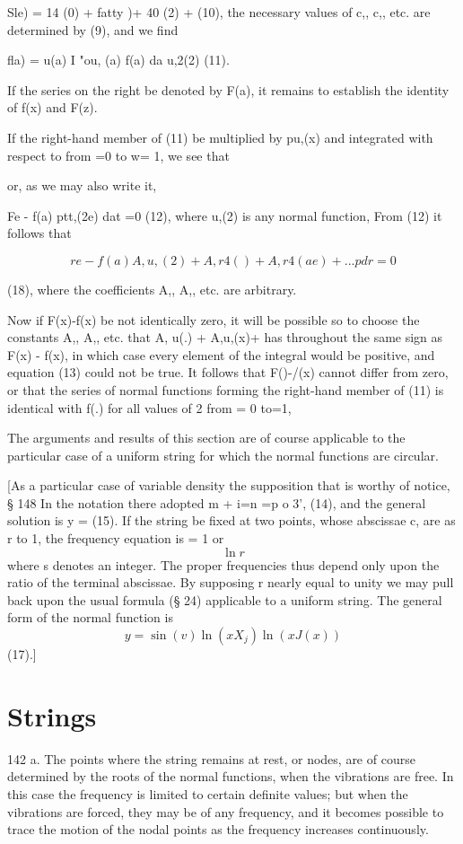 Sle) = 14 (0) + fatty )+ 40 (2) + (10), the necessary values of c,, c,,
etc. are determined by (9), and we find

fla) = u(a) I "ou, (a) f(a) da u,2(2) (11).

If the series on the right be denoted by F(a), it remains to establish
the identity of f(x) and F(z).

If the right-hand member of (11) be multiplied by pu,(x) and integrated
with respect to from =0 to w= 1, we see that

or, as we may also write it,

Fe - f(a) ptt,(2e) dat =0 (12), where u,(2) is any normal function, From
(12) it follows that

\[re - f(a) A,u,(2)+A,r4() +A,r4 (ae) +...p dr= 0\]

(18), where the coefficients A,, A,, etc. are arbitrary.

Now if F(x)-f(x) be not identically zero, it will be possible so to
choose the constants A,, A,, etc. that A, u(.) + A,u,(x)+ has
throughout the same sign as F(x) - f(x), in which case every element of
the integral would be positive, and equation (13) could not be true. It
follows that F()-/(x) cannot differ from zero, or that the series of
normal functions forming the right-hand member of (11) is identical with
f(.) for all values of 2 from = 0 to=1,

The arguments and results of this section are of course applicable to the
particular case of a uniform string for which the normal functions are circular.

[As a particular case of variable density the supposition that is
worthy of notice, § 148 In the notation there adopted m + i=n =p o 3',
(14), and the general solution is y = (15). If the string be fixed at
two points, whose abscissae c, are as r to 1, the frequency equation is
= 1 or
\[\ln r\]
where s denotes an integer. The proper frequencies thus depend only upon
the ratio of the terminal abscissae. By supposing r nearly equal to
unity we may pull back upon the usual formula (§ 24) applicable to a
uniform string. The general form of the normal function is
\[ y = \sin(v) \ln (x X_j) \ln(x J(x) )\]
(17).]

\section{Strings}\label{sect:142a} 142 a.
The points where the string remains at rest, or nodes, are of course
determined by the roots of the normal functions, when the vibrations
are free. In this case the frequency is limited to certain definite
values; but when the vibrations are forced, they may be of any
frequency, and it becomes possible to trace the motion of the nodal
points as the frequency increases continuously.

